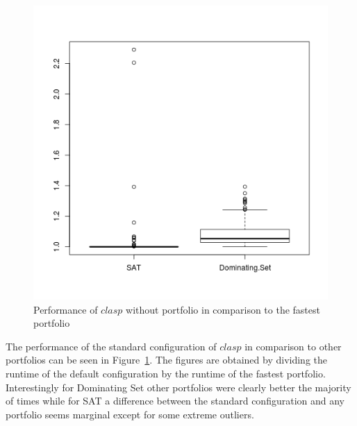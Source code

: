 \begin{figure}[h]
	\center
	\includegraphics[scale=\figscale]{figures/relativePerformance.png}
	\caption{Performance of \inline$clasp$ without portfolio in comparison to the fastest portfolio\label{fig:perf}}
\end{figure}

The performance of the standard configuration of \inline$clasp$ in comparison to other portfolios can be seen in Figure~\ref{fig:perf}. The figures are obtained by dividing the runtime of the default configuration by the runtime of the fastest portfolio.
Interestingly for Dominating Set other portfolios were clearly better the majority of times while for SAT a difference between the standard configuration and any portfolio seems marginal except for some extreme outliers.
